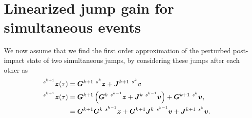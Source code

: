 \documentclass[../DC2019003Bouma.tex]{subfiles}
\begin{document}
\section{Linearized jump gain for simultaneous events}\label{app:multjumps}
We now assume that we find the first order approximation of the perturbed post-impact state of two simultaneous jumps, by considering these jumps after each other as
\begin{align}
\ls^{s^{k+1}}\zb(\tau) &= \Gb^{k+1}\ \ls^{s^{k}}\zb + \Jb^{k+1}\ \ls^{s^{k}}\vb\\
\ls^{s^{k+1}}\zb(\tau) &= \Gb^{k+1}\left(\Gb^k\ \ls^{s^{k-1}}\zb + \Jb^k\ \ls^{s^{k-1}}\vb\right) + \Gb^{k+1}\ \ls^{s^{k}}\vb,\\
&= \Gb^{k+1}\Gb^k\ \ls^{s^{k-1}}\zb + \Gb^{k+1}\Jb^k\ \ls^{s^{k-1}}\vb + \Jb^{k+1}\ \ls^{s^{k}}\vb.\label{eq:zkplus}
\end{align}
\end{document}
